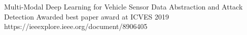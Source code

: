 %
%
%


\begin{publications}
    \publication
        {Multi-Modal Deep Learning for Vehicle Sensor Data Abstraction and Attack Detection}
        {Awarded best paper award at ICVES 2019}
        {https://ieeexplore.ieee.org/document/8906405}
\end{publications}